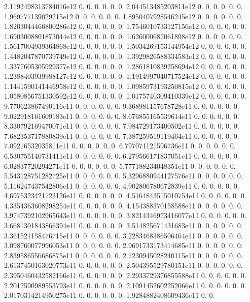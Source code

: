 2.\+1192498313784016e12 0. 0. 0. 0. 0. 0. 2.\+044513485203811e12 0. 0. 0. 0. 0. 0. 1.\+969777139029215e12 0. 0. 0. 0. 0. 0. 1.\+8950407928546245e12 0. 0. 0. 0. 0. 0. 1.\+8203044466800286e12 0. 0. 0. 0. 0. 0. 1.\+7546010733127156e12 0. 0. 0. 0. 0. 0. 1.\+6903008801873044e12 0. 0. 0. 0. 0. 0. 1.\+626000687061898e12 0. 0. 0. 0. 0. 0. 1.\+5617004939364868e12 0. 0. 0. 0. 0. 0. 1.\+5034269153144954e12 0. 0. 0. 0. 0. 0. 1.\+4482047870739749e12 0. 0. 0. 0. 0. 0. 1.\+3929826588334583e12 0. 0. 0. 0. 0. 0. 1.\+3377605305929377e12 0. 0. 0. 0. 0. 0. 1.\+2861810839258694e12 0. 0. 0. 0. 0. 0. 1.\+2388403939988127e12 0. 0. 0. 0. 0. 0. 1.\+1914997040717524e12 0. 0. 0. 0. 0. 0. 1.\+1441590141446958e12 0. 0. 0. 0. 0. 0. 1.\+0985973193250815e12 0. 0. 0. 0. 0. 0. 1.\+0580856751330592e12 0. 0. 0. 0. 0. 0. 1.\+0175740309410339e12 0. 0. 0. 0. 0. 0. 9.\+770623867490116e11 0. 0. 0. 0. 0. 0. 9.\+368981157678728e11 0. 0. 0. 0. 0. 0. 9.\+022918161609183e11 0. 0. 0. 0. 0. 0. 8.\+676855165539614e11 0. 0. 0. 0. 0. 0. 8.\+330792169470071e11 0. 0. 0. 0. 0. 0. 7.\+984729173400502e11 0. 0. 0. 0. 0. 0. 7.\+682353717880839e11 0. 0. 0. 0. 0. 0. 7.\+387259519119464e11 0. 0. 0. 0. 0. 0. 7.\+09216532035811e11 0. 0. 0. 0. 0. 0. 6.\+797071121596736e11 0. 0. 0. 0. 0. 0. 6.\+530755140731411e11 0. 0. 0. 0. 0. 0. 6.\+279566171837051e11 0. 0. 0. 0. 0. 0. 6.\+02837720294271e11 0. 0. 0. 0. 0. 0. 5.\+777188234048351e11 0. 0. 0. 0. 0. 0. 5.\+543128751282725e11 0. 0. 0. 0. 0. 0. 5.\+3296880944127576e11 0. 0. 0. 0. 0. 0. 5.\+116247437542806e11 0. 0. 0. 0. 0. 0. 4.\+902806780672839e11 0. 0. 0. 0. 0. 0. 4.\+6975323421723126e11 0. 0. 0. 0. 0. 0. 4.\+5164843515010754e11 0. 0. 0. 0. 0. 0. 4.\+3354363608298254e11 0. 0. 0. 0. 0. 0. 4.\+154388370158588e11 0. 0. 0. 0. 0. 0. 3.\+9747392102965643e11 0. 0. 0. 0. 0. 0. 3.\+8214346973416077e11 0. 0. 0. 0. 0. 0. 3.\+6681301843866394e11 0. 0. 0. 0. 0. 0. 3.\+514825671431683e11 0. 0. 0. 0. 0. 0. 3.\+361521158476715e11 0. 0. 0. 0. 0. 0. 3.\+2283468386506464e11 0. 0. 0. 0. 0. 0. 3.\+098760077996053e11 0. 0. 0. 0. 0. 0. 2.\+9691733173414685e11 0. 0. 0. 0. 0. 0. 2.\+839586556686875e11 0. 0. 0. 0. 0. 0. 2.\+7230945028240115e11 0. 0. 0. 0. 0. 0. 2.\+6137450163020773e11 0. 0. 0. 0. 0. 0. 2.\+504395529780151e11 0. 0. 0. 0. 0. 0. 2.\+3950460432582166e11 0. 0. 0. 0. 0. 0. 2.\+2933729376855588e11 0. 0. 0. 0. 0. 0. 2.\+2012590989553793e11 0. 0. 0. 0. 0. 0. 2.\+1091452602252066e11 0. 0. 0. 0. 0. 0. 2.\+0170314214950275e11 0. 0. 0. 0. 0. 0. 1.\+9284882408609436e11 0. 0. 